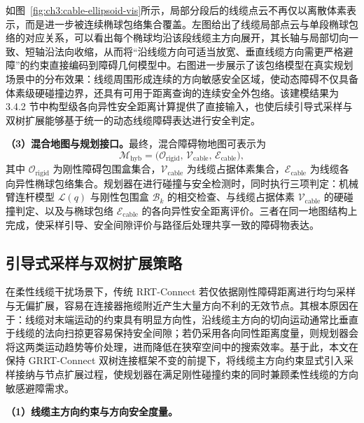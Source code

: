 如图~\ref{fig:ch3:cable-ellipsoid-vis}所示，局部分段后的线缆点云不再仅以离散体素表示，而是进一步被连续椭球包络集合覆盖。左图给出了线缆局部点云与单段椭球包络的对应关系，可以看出每个椭球均沿该段线缆主方向展开，其长轴与局部切向一致、短轴沿法向收缩，从而将“沿线缆方向可适当放宽、垂直线缆方向需更严格避障”的约束直接编码到障碍几何模型中。右图进一步展示了该包络模型在真实规划场景中的分布效果：线缆周围形成连续的方向敏感安全区域，使动态障碍不仅具备体素级硬碰撞边界，还具有可用于距离查询的连续安全外包络。该建模结果为 3.4.2 节中构型级各向异性安全距离计算提供了直接输入，也使后续引导式采样与双树扩展能够基于统一的动态线缆障碍表达进行安全判定。

\textbf{（3）混合地图与规划接口。}最终，混合障碍物地图可表示为
\begin{equation}
  \mathcal{M}_{\mathrm{hyb}}=\bigl(\mathcal{O}_{\mathrm{rigid}},\,\mathcal{V}_{\mathrm{cable}},\,\mathcal{E}_{\mathrm{cable}}\bigr),
\end{equation}
其中 $\mathcal{O}_{\mathrm{rigid}}$ 为刚性障碍包围盒集合，$\mathcal{V}_{\mathrm{cable}}$ 为线缆占据体素集合，$\mathcal{E}_{\mathrm{cable}}$ 为线缆各向异性椭球包络集合。规划器在进行碰撞与安全检测时，同时执行三项判定：机械臂连杆模型 $\mathcal{L}(q)$ 与刚性包围盒 $\mathcal{B}_k$ 的相交检查、与线缆占据体素 $\mathcal{V}_{\mathrm{cable}}$ 的硬碰撞判定、以及与椭球包络 $\mathcal{E}_{\mathrm{cable}}$ 的各向异性安全距离评价。三者在同一地图结构上完成，使采样引导、安全间隙评价与路径后处理共享一致的障碍物表达。

\subsection{引导式采样与双树扩展策略}

在柔性线缆干扰场景下，传统 RRT-Connect 若仅依据刚性障碍距离进行均匀采样与无偏扩展，容易在连接器拖缆附近产生大量方向不利的无效节点。其根本原因在于：线缆对末端运动的约束具有明显方向性，沿线缆主方向的切向运动通常比垂直于线缆的法向扫掠更容易保持安全间隙；若仍采用各向同性距离度量，则规划器会将这两类运动趋势等价处理，进而降低在狭窄空间中的搜索效率。基于此，本文在保持 GRRT-Connect 双树连接框架不变的前提下，将线缆主方向约束显式引入采样接纳与节点扩展过程，使规划器在满足刚性碰撞约束的同时兼顾柔性线缆的方向敏感避障需求。

\textbf{（1）线缆主方向约束与方向安全度量。}

